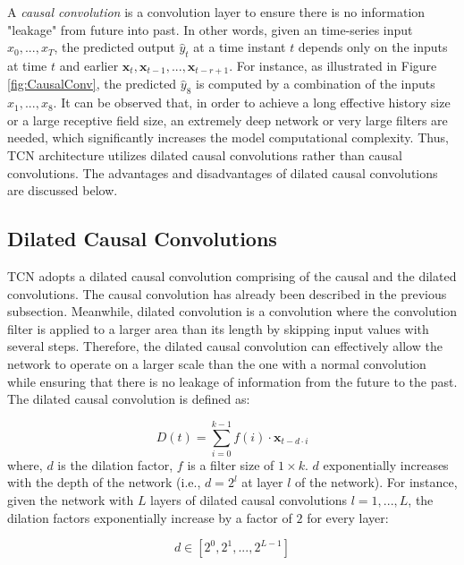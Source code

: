 A \textit{causal convolution} is a convolution layer to ensure there is no information "leakage" from future into past.
In other words, given an time-series input $x_0,..., x_{T}$, the predicted output $\widehat{y}_t$ at a time instant $t$ depends only on the inputs at time $t$ and earlier $\mathbf{x}_t, \mathbf{x}_{t-1}, ...,\mathbf{x}_{t-r+1}$.
For instance, as illustrated in Figure \ref{fig:CausalConv}, the predicted $\widehat{y}_8$ is computed by a combination of the inputs $x_1, ..., x_8$.
It can be observed that, in order to achieve a long effective history size or a large receptive field size, an extremely deep network or very large filters are needed, which significantly increases the model computational complexity.
Thus, TCN architecture utilizes dilated causal convolutions rather than causal convolutions.
The advantages and disadvantages of dilated causal convolutions are discussed below.


\subsection{Dilated Causal Convolutions}

TCN adopts a dilated causal convolution comprising of the causal and the dilated convolutions.
The causal convolution has already been described in the previous subsection.
Meanwhile, dilated convolution \cite{Network_Dilated1, Network_Dilated2, Network_Dilated3} is a convolution where the convolution filter is applied to a larger area than its length by skipping input values with several steps.
Therefore, the dilated causal convolution can effectively allow the network to operate on a larger scale than the one with a normal convolution while ensuring that there is no leakage of information from the future to the past.
The dilated causal convolution is defined as:

\begin{equation}
  D(t) = \sum_{i=0}^{k-1} f(i) \cdot \mathbf{x}_{t-d \cdot i}
  \label{eqn:TCN_dilatedConv}
\end{equation}
where, $d$ is the dilation factor, $f$ is a filter size of $1 \times k$.
$d$ exponentially increases with the depth of the network (i.e., $d = 2^l$ at layer $l$ of the network).
For instance, given the network with $L$ layers of dilated causal convolutions $l = 1, ..., L$, the dilation factors exponentially increase by a factor of $2$ for every layer:

\begin{equation}
  d \in [2^0, 2^1, ..., 2^{L-1}]
  \label{eqn:TCN_dilatedFactor}
\end{equation}

